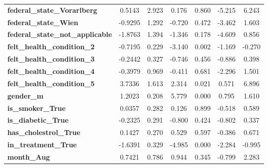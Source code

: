\documentclass[12 pt]{scrartcl}
\numberwithin{equation}{section}
\begin{document}
\begin{table}[htb]
\begin{center}
\begin{tabular}{|l||c|c|c|c|cc|}
        \textbf{federal\_state\_Vorarlberg}       &       0.5143  &        2.923     &     0.176  &         0.860        &       -5.215    &        6.243     \\
        \textbf{federal\_state\_Wien}             &      -0.9295  &        1.292     &    -0.720  &         0.472        &       -3.462    &        1.603     \\
        \textbf{federal\_state\_not\_applicable}  &      -1.8763  &        1.394     &    -1.346  &         0.178        &       -4.609    &        0.856     \\ \hline
        \textbf{felt\_health\_condition\_2}       &      -0.7195  &        0.229     &    -3.140  &         0.002        &       -1.169    &       -0.270     \\
        \textbf{felt\_health\_condition\_3}       &      -0.2442  &        0.327     &    -0.746  &         0.456        &       -0.886    &        0.398     \\
        \textbf{felt\_health\_condition\_4}       &      -0.3979  &        0.969     &    -0.411  &         0.681        &       -2.296    &        1.501     \\
        \textbf{felt\_health\_condition\_5}       &       3.7336  &        1.613     &     2.314  &         0.021        &        0.571    &        6.896     \\ \hline
        \textbf{gender\_m}                        &       1.2023  &        0.208     &     5.779  &         0.000        &        0.795    &        1.610     \\ \hline
        \textbf{is\_smoker\_True}                 &       0.0357  &        0.282     &     0.126  &         0.899        &       -0.518    &        0.589     \\ \hline
        \textbf{is\_diabetic\_True}               &      -0.2325  &        0.291     &    -0.800  &         0.424        &       -0.802    &        0.337     \\ \hline
        \textbf{has\_cholestrol\_True}            &       0.1427  &        0.270     &     0.529  &         0.597        &       -0.386    &        0.671     \\ \hline
        \textbf{in\_treatment\_True}              &      -1.6391  &        0.329     &    -4.985  &         0.000        &       -2.284    &       -0.995     \\ \hline
        \textbf{month\_Aug}                       &       0.7421  &        0.786     &     0.944  &         0.345        &       -0.799    &        2.283     \\

\end{tabular}
\end{center}
\end{table}
\end{document}
